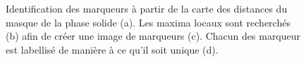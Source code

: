 \begin{figure}
{
			}
			\caption{\label{fig05:imProc_markers}Identification des marqueurs à partir de la carte des distances du masque de la phase solide (a). Les maxima locaux sont recherchés (b) afin de créer une image de marqueurs (c). Chacun des marqueur est labellisé de manière à ce qu'il soit unique (d).}
		\end{figure}
